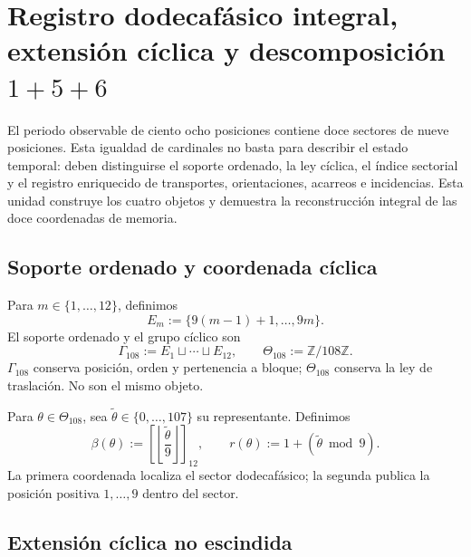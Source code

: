 
\chapter{Registro dodecafásico integral, extensión cíclica y descomposición \(1+5+6\)}
\label{chap:registro-dodecafasico-integral}

El periodo observable de ciento ocho posiciones contiene doce sectores de
nueve posiciones. Esta igualdad de cardinales no basta para describir el
estado temporal: deben distinguirse el soporte ordenado, la ley cíclica, el
índice sectorial y el registro enriquecido de transportes, orientaciones,
acarreos e incidencias. Esta unidad construye los cuatro objetos y demuestra
la reconstrucción integral de las doce coordenadas de memoria.

\section{Soporte ordenado y coordenada cíclica}

Para \(m\in\{1,\ldots,12\}\), definimos
\begin{equation}
 E_m:=\{9(m-1)+1,\ldots,9m\}.
 \label{eq:u006d-bloques-nonadicos}
\end{equation}
El soporte ordenado y el grupo cíclico son
\begin{equation}
 \Gamma_{108}:=
 E_1\sqcup\cdots\sqcup E_{12},
 \qquad
 \Theta_{108}:=\mathbb Z/108\mathbb Z.
 \label{eq:u006d-gamma-theta}
\end{equation}
\(\Gamma_{108}\) conserva posición, orden y pertenencia a bloque;
\(\Theta_{108}\) conserva la ley de traslación. No son el mismo objeto.

Para \(\theta\in\Theta_{108}\), sea
\(\widetilde\theta\in\{0,\ldots,107\}\) su representante. Definimos
\begin{equation}
 \beta(\theta):=
 \left[
 \left\lfloor\frac{\widetilde\theta}{9}\right\rfloor
 \right]_{12},
 \qquad
 r(\theta):=1+(\widetilde\theta\bmod9).
 \label{eq:u006d-coordenadas-bloque-residuo}
\end{equation}
La primera coordenada localiza el sector dodecafásico; la segunda publica
la posición positiva \(1,\ldots,9\) dentro del sector.

\section{Extensión cíclica no escindida}

